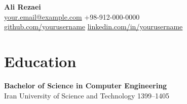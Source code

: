 \documentclass[11pt,a4paper]{article}
\begin{document}
\begin{center}
    {\Large \textbf{Ali Rezaei}}\\
    \href{mailto:your.email@example.com}{your.email@example.com} \textbar{} +98-912-000-0000 \\
    \href{https://github.com/yourusername}{github.com/yourusername} \textbar{} \href{https://www.linkedin.com/in/yourusername}{linkedin.com/in/yourusername}
\end{center}


\section*{Education}
\textbf{Bachelor of Science in Computer Engineering}\\
Iran University of Science and Technology \hfill 1399--1405











\end{document}
